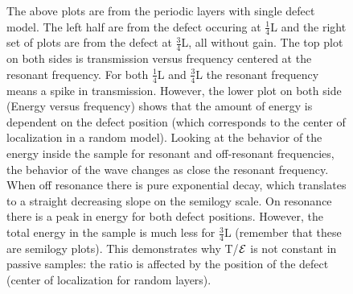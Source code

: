 
\begin{figure}
\vskip -0.5cm
\centerline{
}
\vskip -0.5cm
\caption[The above plots are from the periodic layers with
single defect model.]{The above plots are from the periodic layers with
single defect model. The left half are from the defect occuring
at $ \frac{1}{4} $L and the right set of plots are from the defect
at $ \frac{3}{4} $L, all without gain.  The top plot on both 
sides is transmission versus frequency centered at the resonant
frequency. For both $ \frac{1}{4} $L and $ \frac{3}{4} $L the resonant
frequency means a spike in transmission.  However, the lower plot
on both side (Energy versus frequency) shows that the amount of
energy is dependent on the defect position (which corresponds to
the center of localization in a random model).  Looking at
the behavior of the energy inside the sample for resonant
and off-resonant frequencies, the behavior of the wave changes
as close the resonant frequency. When off resonance there is
pure exponential decay, which translates to a straight decreasing
slope on the semilogy scale. On resonance there is a peak in energy
for both defect positions. However, the total energy in the sample
is much less for $ \frac{3}{4} $L (remember that these are semilogy
plots).  This demonstrates why T/${\cal E}$ is not constant in passive samples:
the ratio is affected by the position of the defect (center of localization
for random layers).}
\label{fig:peaksmatchnotmatch}
\end{figure}

